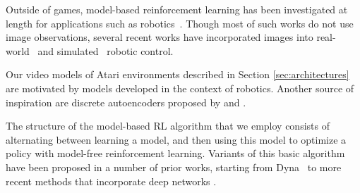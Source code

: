 Outside of games, model-based reinforcement learning has been investigated at length for applications such as robotics~\cite{deisenroth}. Though most of such works do not use image observations, several recent works
have incorporated images into real-world~\cite{deep_spatial, finn2016, sv2p, ebert, piergiovanni, paxton, rybkin-pertsch,ebert2018visual} and simulated~\cite{embed_to_control, hafner} robotic control. 

Our video models of Atari environments described in Section \ref{sec:architectures} are motivated by models developed in the context of robotics. Another source of inspiration are discrete autoencoders proposed by \citet{neural_discrete} and \citet{auto_discrete}.

The structure of the model-based RL algorithm that we employ consists of alternating between learning a model, and then using this model to optimize a policy with model-free reinforcement learning. Variants of this basic algorithm have been proposed in a number of prior works, starting from Dyna~\cite{dyna} to more recent methods that incorporate deep networks
\cite{stochastic_value_gradients, model_based_value_estimation, uncertainty_driven_imagination, trpo_ensemble}.